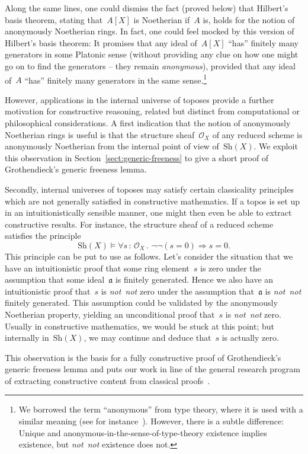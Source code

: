\documentclass[10pt,reqno,a4paper]{amsbook}
\theoremstyle{definition}
\theoremstyle{plain}
\theoremstyle{remark}
\renewcommand{\O}{\mathcal{O}}
\newcommand{\aaa}{\mathfrak{a}}
\newcommand{\Sh}{\mathrm{Sh}}
\newcommand{\?}{\,{:}\,}
\renewcommand{\_}{\mathpunct{.}\,}
\newcommand{\notnot}{\emph{not~not}\xspace}
\begin{document}
{Along the same lines, one could dismiss the fact (proved below) that Hilbert's
basis theorem, stating that~$A[X]$ is Noetherian if~$A$ is, holds for the
notion of anonymously Noetherian rings. In fact, one could feel mocked by this
version of Hilbert's basis theorem: It promises that any ideal of~$A[X]$
``has'' finitely many generators in some Platonic sense (without providing any
clue on how one might go on to find the generators -- they remain \emph{anonymous}), provided
that any ideal of~$A$ ``has'' finitely many generators in the same
sense.\footnote{We borrowed the term ``anonymous'' from type theory, where it
is used with a similar meaning (see for
instance~\cite{kraus-escardo-coquand-altenkirch:anonymous}). However, there is
a subtle difference: Unique and anonymous-in-the-sense-of-type-theory existence
implies existence, but \notnot existence does not.}

However, applications in the internal universe of toposes provide a further
motivation for constructive reasoning, related but distinct from computational
or philosophical considerations. A first indication that the notion of anonymously
Noetherian rings is useful is that the structure sheaf~$\O_X$ of any reduced
scheme is anonymously Noetherian from the internal point of view of~$\Sh(X)$. We
exploit this observation in Section~\ref{sect:generic-freeness} to give a short
proof of Grothendieck's generic freeness lemma.

Secondly, internal universes of toposes may satisfy certain classicality
principles which are not generally satisfied in constructive mathematics. If
a topos is set up in an intuitionistically sensible manner, one might then even
be able to extract constructive results. For instance, the structure sheaf of a
reduced scheme satisfies the principle
\[ \Sh(X) \models \forall s\?\O_X\_
  \neg\neg(s = 0) \Longrightarrow s = 0. \]
This principle can be put to use as follows. Let's consider the situation that
we have an intuitionistic proof that some ring element~$s$ is zero under the
assumption that some ideal~$\aaa$ is finitely generated. Hence we also have an
intuitionistic proof that~$s$ is \notnot zero under the assumption that~$\aaa$
is \notnot finitely generated. This assumption could be validated by the anonymously
Noetherian property, yielding an unconditional proof that~$s$ is \notnot zero.
Usually in constructive mathematics, we would be stuck at this point; but
internally in~$\Sh(X)$, we may continue and deduce that~$s$ is actually zero.

This observation is the basis for a fully constructive proof of Grothendieck's
generic freeness lemma and puts our work in line of the general research
program of extracting constructive content from classical
proofs~\cite{coquand:classical,feferman:kreisel,kohlenbach:applprooftheory,kiselyov:lem}.

}
\end{document}

